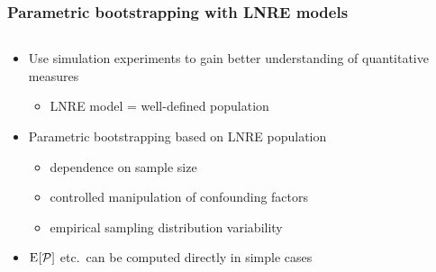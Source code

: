 \documentclass[t]{beamer} %
\begin{document}
\begin{frame}
  \frametitle{Parametric bootstrapping with LNRE models}

  \begin{columns}[T]
    \begin{column}{55mm}
      \begin{itemize}
      \item Use simulation experiments to gain better understanding of quantitative measures
        \begin{itemize}
        \item LNRE model = well-defined population
      \end{itemize}
      \item<2-> Parametric bootstrapping based on LNRE population
        \begin{itemize}
        \item dependence on sample size
        \item controlled manipulation of confounding factors
        \item empirical sampling distribution \so variability
        \end{itemize}
      \item<2-> $\mathrm{E}_{}[\mathcal{P}]$ etc.\ can be computed directly in simple cases
      \end{itemize}
    \end{column}
    \begin{column}{45mm}
    \end{column}
  \end{columns}
\end{frame}
\end{document}
